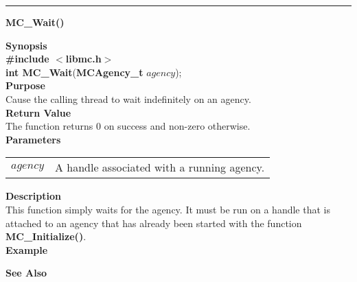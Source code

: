 \noindent
\vspace{5pt}
\rule{6.5in}{0.015in}
\noindent
{\LARGE \bf MC\_Wait()}\\
{}

\noindent
{\bf Synopsis}\\
{\bf \#include $<$libmc.h$>$}\\
{\bf int MC\_Wait}({\bf MCAgency\_t} $agency$);\\

\noindent
{\bf Purpose}\\
Cause the calling thread to wait indefinitely on an agency.\\

\noindent
{\bf Return Value}\\
The function returns 0 on success and non-zero otherwise.\\

\noindent
{\bf Parameters}
\vspace{-0.1in}
\begin{description}
\item               
\begin{tabular}{p{10 mm}p{145 mm}}
$agency$ & A handle associated with a running agency. 
\end{tabular}
\end{description}

\noindent
{\bf Description}\\
This function simply waits for the agency. 
It must be run on a handle that is attached to an agency that has already 
been started with the function {\bf MC\_Initialize()}.\\

\noindent
{\bf Example}\\
\noindent
{\footnotesize}

\noindent
{\bf See Also}\\

